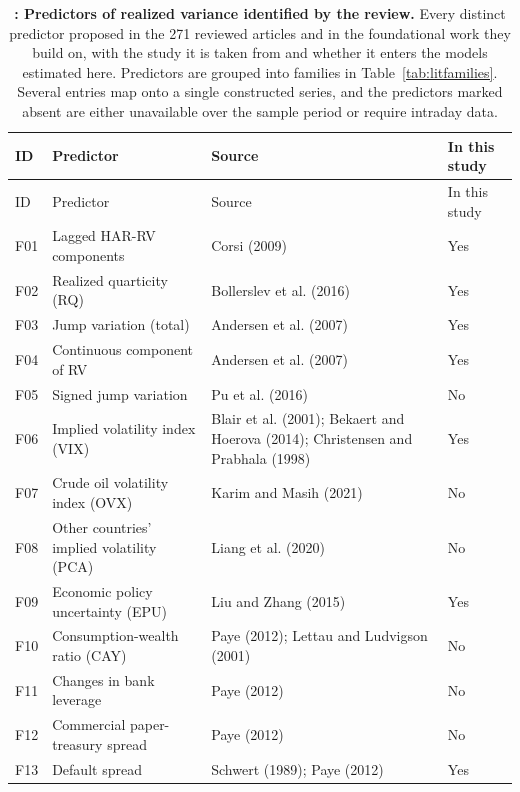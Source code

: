 {\footnotesize
\captionsetup{justification=raggedright,labelsep=none,singlelinecheck=false,labelformat=boldlabel}
\setlength{\tabcolsep}{3pt}
\renewcommand{\arraystretch}{1.1}
\begin{longtable}{>{\raggedright\arraybackslash}m{0.7cm}>{\raggedright\arraybackslash}m{5.5cm}>{\raggedright\arraybackslash}m{5.1cm}>{\raggedleft\arraybackslash}m{1.5cm}}
\caption[Predictors of realized variance identified by the review]{\footnotesize \textbf{: Predictors of realized variance identified by the review.} Every distinct predictor proposed in the 271 reviewed articles and in the foundational work they build on, with the study it is taken from and whether it enters the models estimated here. Predictors are grouped into families in Table~\ref{tab:litfamilies}. Several entries map onto a single constructed series, and the predictors marked absent are either unavailable over the sample period or require intraday data.} \label{tab:litpredictors} \\
\hline
ID & Predictor & Source & In this study \\
\hline
\endfirsthead
\hline
ID & Predictor & Source & In this study \\
\hline
\endhead
\hline
\endfoot
F01 & Lagged HAR-RV components & Corsi (2009) & Yes \\
F02 & Realized quarticity (RQ) & Bollerslev et al. (2016) & Yes \\
F03 & Jump variation (total) & Andersen et al. (2007) & Yes \\
F04 & Continuous component of RV & Andersen et al. (2007) & Yes \\
F05 & Signed jump variation & Pu et al. (2016) & No \\
F06 & Implied volatility index (VIX) & Blair et al. (2001); Bekaert and Hoerova (2014); Christensen and Prabhala (1998) & Yes \\
F07 & Crude oil volatility index (OVX) & Karim and Masih (2021) & No \\
F08 & Other countries' implied volatility (PCA) & Liang et al. (2020) & No \\
F09 & Economic policy uncertainty (EPU) & Liu and Zhang (2015) & Yes \\
F10 & Consumption-wealth ratio (CAY) & Paye (2012); Lettau and Ludvigson (2001) & No \\
F11 & Changes in bank leverage & Paye (2012) & No \\
F12 & Commercial paper-treasury spread & Paye (2012) & No \\
F13 & Default spread & Schwert (1989); Paye (2012) & Yes \\

\end{longtable}}
